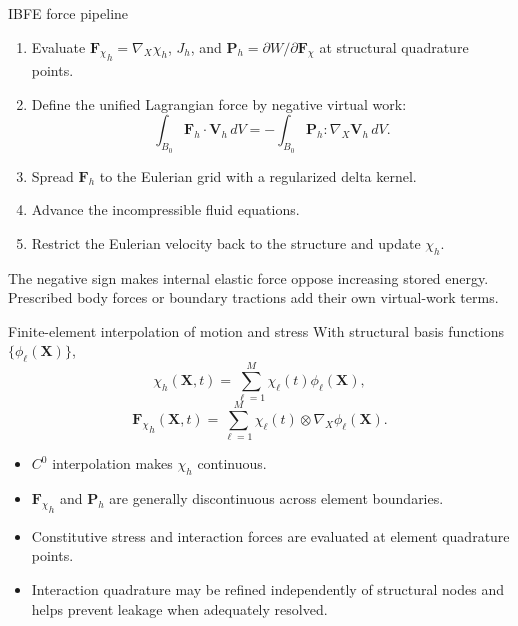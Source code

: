 \documentclass[aspectratio=169,11pt]{beamer}
\newcommand{\X}{\bm{X}}
\newcommand{\Fdef}{\bm{F}_{\chi}}
\newcommand{\Pten}{\bm{P}}
\newcommand{\FLag}{\bm{F}}
\newcommand{\gradX}{\nabla_{\!X}}
\begin{document}
\begin{frame}{IBFE force pipeline}
\small
\begin{enumerate}\itemsep5pt
  \item Evaluate \({\Fdef}_h=\gradX\chi_h\), \(J_h\), and
  \(\Pten_h=\partial W/\partial\Fdef\) at structural quadrature points.
  \item Define the unified Lagrangian force by negative virtual work:
  \[
    \int_{B_0}\FLag_h\cdot\bm{V}_h\,dV
    =
    -\int_{B_0}\Pten_h:\gradX\bm{V}_h\,dV.
  \]
  \item Spread \(\FLag_h\) to the Eulerian grid with a regularized delta kernel.
  \item Advance the incompressible fluid equations.
  \item Restrict the Eulerian velocity back to the structure and update \(\chi_h\).
\end{enumerate}
\medskip
\begin{punchbox}
\small
The negative sign makes internal elastic force oppose increasing stored energy. Prescribed body forces or boundary tractions add their own virtual-work terms.
\end{punchbox}
\end{frame}

\begin{frame}{Finite-element interpolation of motion and stress}
With structural basis functions \(\{\phi_\ell(\X)\}\),
\[
  \chi_h(\X,t)
  =
  \sum_{\ell=1}^{M}
  \chi_\ell(t)\phi_\ell(\X),
\]
\[
{\Fdef}_h(\X,t)
  =
  \sum_{\ell=1}^{M}
  \chi_\ell(t)\otimes\gradX\phi_\ell(\X).
\]
\begin{itemize}\itemsep5pt
  \item \(C^0\) interpolation makes \(\chi_h\) continuous.
  \item \({\Fdef}_h\) and \(\Pten_h\) are generally discontinuous across element boundaries.
  \item Constitutive stress and interaction forces are evaluated at element quadrature points.
  \item Interaction quadrature may be refined independently of structural nodes and helps prevent leakage when adequately resolved.
\end{itemize}
\end{frame}
\end{document}
